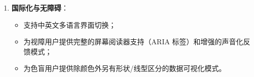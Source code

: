 \begin{enumerate}[label=(\arabic*), leftmargin=*]
  \item \textbf{国际化与无障碍}：
        \begin{itemize}
          \item 支持中英文多语言界面切换；
          \item 为视障用户提供完整的屏幕阅读器支持（ARIA 标签）和增强的声音化反馈模式；
          \item 为色盲用户提供除颜色外另有形状/线型区分的数据可视化模式。
        \end{itemize}
\end{enumerate}

\endinput

